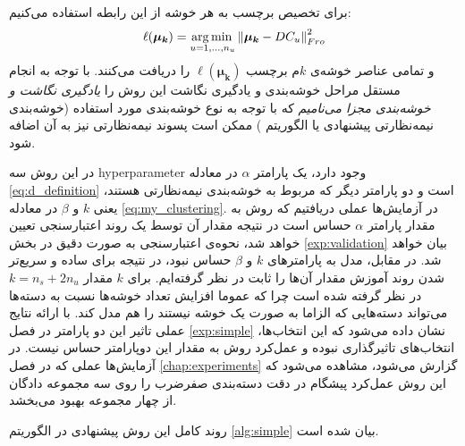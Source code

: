 برای تخصیص برچسب به هر خوشه از این رابطه استفاده می‌کنیم:
\begin{equation}
\label{eq:simple_assignment}
\ell(\boldsymbol{\mu_k}) = \operatorname*{arg\,min\,}_{u=1,\ldots,n_u} \left \lVert \boldsymbol{\mu_k} - DC_{u} \right \rVert_{Fro}^2
\end{equation}
و تمامی عناصر خوشه‌ی $k$م برچسب $\ell(\boldsymbol{\mu_k})$ را دریافت می‌کنند. با توجه به انجام مستقل مراحل خوشه‌بندی و یادگیری نگاشت این روش را
\textit{یادگیری نگاشت و خوشه‌بندی مجزا می‌نامیم}
که با توجه به نوع خوشه‌بندی مورد استفاده (خوشه‌بندی نیمه‌نظارتی پیشنهادی یا الگوریتم ) ممکن است پسوند نیمه‌نظارتی نیز به آن اضافه شود.

در این روش سه \gls{hyperparameter} وجود دارد، یک پارامتر $\alpha$ در معادله
\eqref{eq:d_definition}
است و دو پارامتر دیگر که مربوط به خوشه‌بندی نیمه‌نظارتی هستند، یعنی $k$ و $\beta$ در معادله
\eqref{eq:my_clustering}.
در آزمایش‌ها عملی دریافتیم که روش به مقدار پارامتر $\alpha$ حساس است در نتیجه مقدار آن توسط یک روند اعتبارسنجی تعیین خواهد شد، نحوه‌ی اعتبارسنجی به صورت دقیق در بخش
\ref{exp:validation}
بیان خواهد شد. در مقابل، مدل به پارامترهای $k$ و $\beta$ حساس نبود، در نتیجه برای ساده و سریع‌تر شدن روند آموزش مقدار آن‌ها را ثابت در نظر گرفته‌ایم. برای $k$ مقدار
$k = n_s + 2n_u$
در نظر گرفته شده است چرا که عموما افزایش تعداد خوشه‌ها نسبت به دسته‌ها می‌تواند دسته‌هایی که الزاما به صورت یک خوشه نیستند را هم مدل کند.
 با ارائه نتایج عملی تاثیر این دو پارامتر در فصل
 \ref{exp:simple}
 نشان داده می‌شود که این انتخاب‌ها، انتخاب‌های تاثیرگذاری نبوده و عمل‌کرد روش به مقدار این دوپارامتر حساس نیست.
در آزمایش‌ها عملی که در فصل
\ref{chap:experiments}
گزارش می‌شود، مشاهده می‌شود که این روش  عمل‌کرد پیشگام در دقت دسته‌بندی صفرضرب را روی سه مجموعه دادگان از چهار مجموعه بهبود می‌بخشد.



روند کامل این روش پیشنهادی در الگوریتم
\ref{alg:simple}
بیان شده است.

